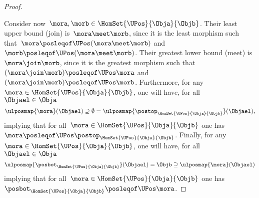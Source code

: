 \begin{proof}
\begin{itemize}
	\end{itemize}
	Consider now~$\mora,\morb \in \HomSet{\UPos}{\Obja}{\Objb}$.
	Their least upper bound (join) is~$\mora \meet \morb$, since it is the least morphism such that~$\mora \posleqof\UPos (\mora \meet \morb)$ and~$\morb \posleqof\UPos (\mora \meet \morb)$.
	Their greatest lower bound (meet) is~$\mora \join \morb$, since it is the greatest morphism such that~$(\mora \join \morb)\posleqof\UPos \mora $ and~$(\mora \join \morb)\posleqof\UPos \morb$.
	Furthermore, for any~$\mora \in \HomSet{\UPos}{\Obja}{\Objb}$, one will have, for all~$\Objael \in \Obja$
	\begin{equation*}
		\ulposmap{\mora}(\Objael) \supseteq \emptyset=\ulposmap{\postop_{\HomSet{\UPos}{\Obja}{\Objb}}}(\Objael),
	\end{equation*}
	implying that for all~$\mora \in \HomSet{\UPos}{\Obja}{\Objb}$ one has~$\mora \posleqof\UPos \postop_{\HomSet{\UPos}{\Obja}{\Objb}}$.
	Finally, for any~$\mora \in \HomSet{\UPos}{\Obja}{\Objb}$, one will have, for all~$\Objael \in \Obja$
	\begin{equation*}
		\ulposmap{\posbot_{\HomSet{\UPos}{\Obja}{\Objb}}}(\Objael)=\Objb \supseteq \ulposmap{\mora}(\Objael)
	\end{equation*}
	implying that for all~$\mora \in \HomSet{\UPos}{\Obja}{\Objb}$ one has~$\posbot_{\HomSet{\UPos}{\Obja}{\Objb}}\posleqof\UPos \mora$.
\end{proof}

